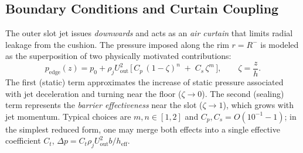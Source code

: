 \documentclass[11pt,a4paper]{article}
\begin{document}
\subsection{Boundary Conditions and Curtain Coupling} \label{sec:boundaryconditions}
The outer slot jet issues \emph{downwards} and acts as an \emph{air curtain} that
limits radial leakage from the cushion. The pressure imposed along the rim
$r=R^{-}$ is modeled as the superposition of two physically motivated
contributions:
\begin{equation}
  p_{\mathrm{edge}}(z)
  = p_0 + \rho_j U_{\mathrm{out}}^2\,
    \big[\, C_p\, (1-\zeta)^{n} \;+\; C_s\, \zeta^{m} \,\big],
  \qquad \zeta=\frac{z}{h}.
  \label{eq:rim_pressure_composite}
\end{equation}
The first (static) term approximates the increase of static pressure associated with
jet deceleration and turning near the floor ($\zeta\!\to\!0$). The second (sealing)
term represents the \emph{barrier effectiveness} near the slot ($\zeta\!\to\!1$),
which grows with jet momentum. Typical choices are $m,n\in[1,2]$ and
$C_p,C_s=O(10^{-1}\!\!-\!1)$; in the simplest reduced form, one may merge both
effects into a single effective coefficient $C_t$,
$\Delta p = C_t \rho_j U_{\mathrm{out}}^2 b / h_{\mathrm{eff}}$.
\end{document}
